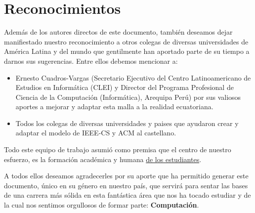 \chapter*{Reconocimientos}\label{chap:cs-ack}
%

Además de los autores directos de este documento, también deseamos dejar manifiestado nuestro 
reconocimiento a otros colegas de diversas universidades de América Latina y del mundo que 
gentilmente han aportado parte de su tiempo a darnos sus sugerencias. Entre ellos debemos
mencionar a:

\begin{itemize}
\item Ernesto Cuadros-Vargas (Secretario Ejecutivo del Centro Latinoamericano de Estudios en Informática (CLEI) 
y Director del Programa Profesional de Ciencia de la Computación (Informática), Arequipa Perú) por sus valiosos 
aportes a mejorar y adaptar esta malla a la realidad ecuatoriana.

\item Todos los colegas de diversas universidades y paises que ayudaron crear y 
adaptar el modelo de IEEE-CS y ACM al castellano.
\end{itemize}

Todo este equipo de trabajo asumió como premisa que el centro de nuestro esfuerzo, es la 
formación académica y humana \underline{de los estudiantes}.

A todos ellos deseamos agradecerles por su aporte que ha permitido generar este documento, 
único en su género en nuestro país, que servirá para sentar las bases de una carrera más 
sólida en esta fantástica área que nos ha tocado estudiar y de la cual nos sentimos orgullosos 
de formar parte: \textbf{Computación}.
